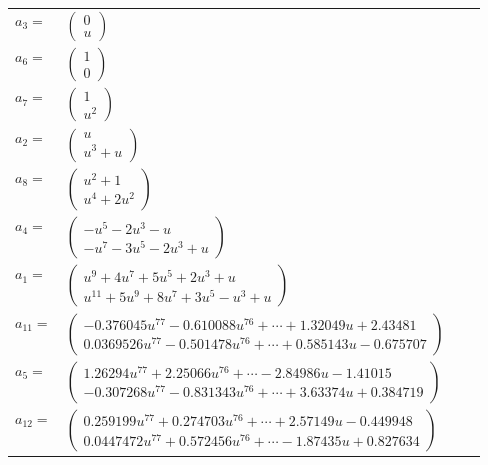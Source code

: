 \documentclass[1p]{elsarticle_modified}
\theoremstyle{definition}
\begin{document}
\begin{tabular}{m{7pt} m{180pt} m{7pt} m{180pt} }
\flushright $a_{3}=$&$\begin{pmatrix}0\\u\end{pmatrix}$ \\
\flushright $a_{6}=$&$\begin{pmatrix}1\\0\end{pmatrix}$ \\
\flushright $a_{7}=$&$\begin{pmatrix}1\\u^2\end{pmatrix}$ \\
\flushright $a_{2}=$&$\begin{pmatrix}u\\u^3+u\end{pmatrix}$ \\
\flushright $a_{8}=$&$\begin{pmatrix}u^2+1\\u^4+2 u^2\end{pmatrix}$ \\
\flushright $a_{4}=$&$\begin{pmatrix}- u^5-2 u^3- u\\- u^7-3 u^5-2 u^3+u\end{pmatrix}$ \\
\flushright $a_{1}=$&$\begin{pmatrix}u^9+4 u^7+5 u^5+2 u^3+u\\u^{11}+5 u^9+8 u^7+3 u^5- u^3+u\end{pmatrix}$ \\
\flushright $a_{11}=$&$\begin{pmatrix}-0.376045 u^{77}-0.610088 u^{76}+\cdots+1.32049 u+2.43481\\0.0369526 u^{77}-0.501478 u^{76}+\cdots+0.585143 u-0.675707\end{pmatrix}$ \\
\flushright $a_{5}=$&$\begin{pmatrix}1.26294 u^{77}+2.25066 u^{76}+\cdots-2.84986 u-1.41015\\-0.307268 u^{77}-0.831343 u^{76}+\cdots+3.63374 u+0.384719\end{pmatrix}$ \\
\flushright $a_{12}=$&$\begin{pmatrix}0.259199 u^{77}+0.274703 u^{76}+\cdots+2.57149 u-0.449948\\0.0447472 u^{77}+0.572456 u^{76}+\cdots-1.87435 u+0.827634\end{pmatrix}$ \\

\end{tabular}
\end{document}
